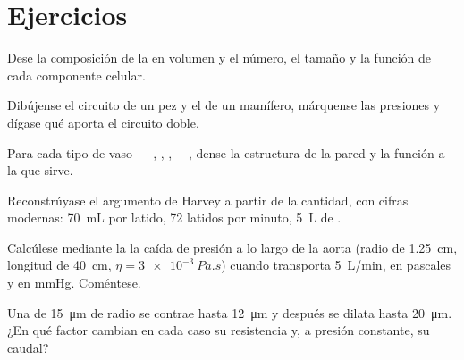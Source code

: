 \section{Ejercicios}

\begin{exercise}[$\star$]\label{exo:b2:blood-circulation:1}
Dese la composición de la  en volumen y el número, el tamaño y la
función de cada componente celular.
\end{exercise}

\begin{exercise}[$\star$]\label{exo:b2:blood-circulation:2}
Dibújense el circuito de un pez y el de un mamífero, márquense las
presiones y dígase qué aporta el circuito doble.
\end{exercise}

\begin{exercise}[$\star$]\label{exo:b2:blood-circulation:3}
Para cada tipo de vaso --- , , ,  ---, dense la
estructura de la pared y la función a la que sirve.
\end{exercise}

\begin{exercise}[$\star$]\label{exo:b2:blood-circulation:4}
Reconstrúyase el argumento de Harvey a partir de la cantidad, con cifras
modernas: \qty{70}{mL} por latido, \num{72} latidos por minuto, \qty{5}{L}
de .
\end{exercise}

\begin{exercise}[$\star\star$]\label{exo:b2:blood-circulation:5}
Calcúlese mediante la  la caída de presión a lo largo de
la aorta (radio de \qty{1.25}{cm}, longitud de \qty{40}{cm},
$\eta = \qty{3e-3}{Pa.s}$) cuando transporta
\qty{5}{L/min}, en pascales y en mmHg. Coméntese.
\end{exercise}

\begin{exercise}[$\star\star$]\label{exo:b2:blood-circulation:6}
Una  de \qty{15}{\micro m} de radio se contrae hasta
\qty{12}{\micro m} y después se dilata hasta \qty{20}{\micro m}. ¿En qué
factor cambian en cada caso su resistencia y, a presión constante, su
caudal?
\end{exercise}

